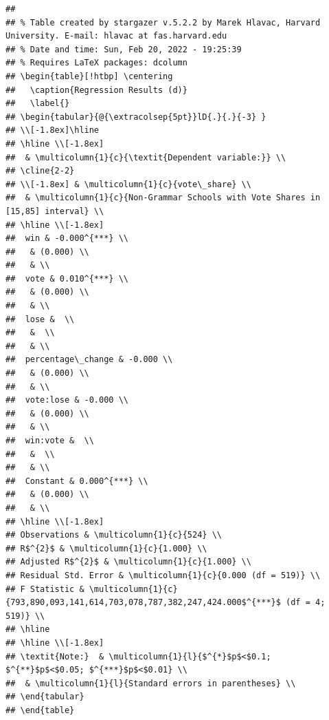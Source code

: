 \documentclass[
  12pt,
  landscape]{article}
\begin{document}
\begin{verbatim}
## 
## % Table created by stargazer v.5.2.2 by Marek Hlavac, Harvard University. E-mail: hlavac at fas.harvard.edu
## % Date and time: Sun, Feb 20, 2022 - 19:25:39
## % Requires LaTeX packages: dcolumn 
## \begin{table}[!htbp] \centering 
##   \caption{Regression Results (d)} 
##   \label{} 
## \begin{tabular}{@{\extracolsep{5pt}}lD{.}{.}{-3} } 
## \\[-1.8ex]\hline 
## \hline \\[-1.8ex] 
##  & \multicolumn{1}{c}{\textit{Dependent variable:}} \\ 
## \cline{2-2} 
## \\[-1.8ex] & \multicolumn{1}{c}{vote\_share} \\ 
##  & \multicolumn{1}{c}{Non-Grammar Schools with Vote Shares in [15,85] interval} \\ 
## \hline \\[-1.8ex] 
##  win & -0.000^{***} \\ 
##   & (0.000) \\ 
##   & \\ 
##  vote & 0.010^{***} \\ 
##   & (0.000) \\ 
##   & \\ 
##  lose &  \\ 
##   &  \\ 
##   & \\ 
##  percentage\_change & -0.000 \\ 
##   & (0.000) \\ 
##   & \\ 
##  vote:lose & -0.000 \\ 
##   & (0.000) \\ 
##   & \\ 
##  win:vote &  \\ 
##   &  \\ 
##   & \\ 
##  Constant & 0.000^{***} \\ 
##   & (0.000) \\ 
##   & \\ 
## \hline \\[-1.8ex] 
## Observations & \multicolumn{1}{c}{524} \\ 
## R$^{2}$ & \multicolumn{1}{c}{1.000} \\ 
## Adjusted R$^{2}$ & \multicolumn{1}{c}{1.000} \\ 
## Residual Std. Error & \multicolumn{1}{c}{0.000 (df = 519)} \\ 
## F Statistic & \multicolumn{1}{c}{793,890,093,141,614,703,078,787,382,247,424.000$^{***}$ (df = 4; 519)} \\ 
## \hline 
## \hline \\[-1.8ex] 
## \textit{Note:}  & \multicolumn{1}{l}{$^{*}$p$<$0.1; $^{**}$p$<$0.05; $^{***}$p$<$0.01} \\ 
##  & \multicolumn{1}{l}{Standard errors in parentheses} \\ 
## \end{tabular} 
## \end{table}
\end{verbatim}
\end{document}
